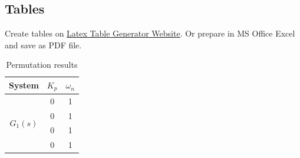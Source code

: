 \subsection{Tables}

Create tables on \href{https://www.tablesgenerator.com/}{Latex Table Generator Website}. Or prepare in MS Office Excel and save as PDF file.

\begin{table}[H]  %
	\centering
	\caption{Permutation results}
	\label{tab:problem14}
	\begin{tabular}{|c|c|c|}
		\hline
		\textbf{System}  & \multicolumn{1}{l|}{\textbf{$K_p$}} & \multicolumn{1}{l|}{\textbf{$\omega_n$}} \\ \hline
		\multirow{4}{*}{$G_1(s)$} & 0                                   & 1                                \\ \cline{2-3} 
		& 0                                   & 1                                \\ \cline{2-3} 
		& 0                                   & 1                                \\ \cline{2-3} 
		& 0                                   & 1                                \\ \hline
	\end{tabular}
\end{table}
